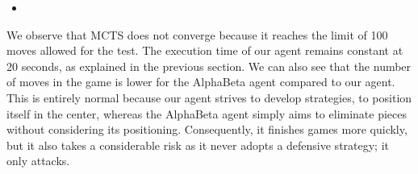 \documentclass[11pt,a4paper]{report}
\begin{document}
\begin{answers}[23cm]
\begin{itemize}
    \item \textbf{}
\end{itemize}
We observe that MCTS does not converge because it reaches the limit of 100 moves allowed for the test. The execution time of our agent remains constant at 20 seconds, as explained in the previous section. We can also see that the number of moves in the game is lower for the AlphaBeta agent compared to our agent. This is entirely normal because our agent strives to develop strategies, to position itself in the center, whereas the AlphaBeta agent simply aims to eliminate pieces without considering its positioning. Consequently, it finishes games more quickly, but it also takes a considerable risk as it never adopts a defensive strategy; it only attacks.

\end{answers}
\end{document}
